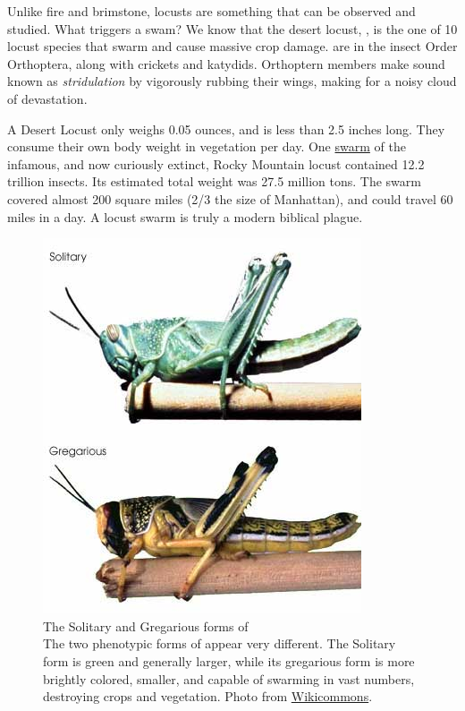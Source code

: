   Unlike fire and brimstone, locusts are something that can be observed and studied. What triggers a swam? We know that the desert locust, \locusts{}, is the one of 10 locust species that swarm and cause massive crop damage. \locusts{} are in the insect Order Orthoptera, along with crickets and katydids. Orthoptern members make sound known as \textit{stridulation} by vigorously rubbing their wings, making for a noisy cloud of devastation.

  A Desert Locust only weighs 0.05 ounces, and is less than 2.5 inches long. They consume their own body weight in vegetation per day. One \href{http://animaldiversity.ummz.umich.edu/site/accounts/information/Melanoplus_spretus.html}{swarm} of the infamous, and now curiously extinct, Rocky Mountain locust contained 12.2 trillion insects. Its estimated total weight was 27.5 million tons. The swarm covered almost 200 square miles (2/3 the size of Manhattan), and could travel 60 miles in a day. A locust swarm is truly a modern biblical plague.

  \begin{figure}[htbp] %
    \centering 
    \includegraphics{Figures/Chapter1/DesertLocust.jpeg}
    \caption[The Solitary and Gregarious forms of \locusts{}]
    {
      The Solitary and Gregarious forms of \locusts{}\\[0.25cm]
      The two phenotypic forms of \locusts{} appear very different. The Solitary form is green and generally larger, while its gregarious form is more brightly colored, smaller, and capable of swarming in vast numbers, destroying crops and vegetation. Photo from \href{http://www.wikicommons.com}{Wikicommons}.
      }
    \label{fig:Locust}
    \end{figure}

